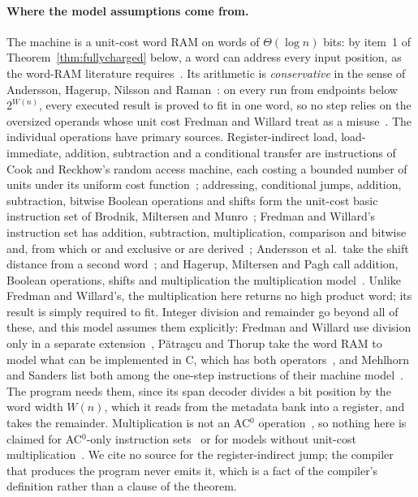\documentclass[11pt]{article}
\theoremstyle{definition}
\theoremstyle{remark}
\begin{document}
\paragraph{Where the model assumptions come from.}
The machine is a unit-cost word RAM on words of $\Theta(\log n)$ bits: by
item~1 of Theorem~\ref{thm:fullycharged} below, a word can address every
input position, as the word-RAM literature
requires~\cite{FredmanWillard93,AHNR98,PatrascuThorup14}. Its arithmetic is
\emph{conservative} in the sense of Andersson, Hagerup, Nilsson and
Raman~\cite{AHNR98}: on every run from endpoints below $2^{W(n)}$, every
executed result is proved to fit in one word, so no step relies on the
oversized operands whose unit cost Fredman and Willard treat as a
misuse~\cite{FredmanWillard93}. The individual operations have primary
sources. Register-indirect load, load-immediate, addition,
subtraction and a conditional transfer are instructions of Cook and
Reckhow's random access machine, each costing a bounded number of units under
its uniform cost function~\cite{CookReckhow73}; addressing, conditional
jumps, addition, subtraction, bitwise Boolean operations and shifts form the
unit-cost basic instruction set of Brodnik, Miltersen and
Munro~\cite{BMM97}; Fredman and Willard's instruction set has addition,
subtraction, multiplication, comparison and bitwise and, from which or and
exclusive or are derived~\cite{FredmanWillard93}; Andersson et al.\ take
the shift distance from a second word~\cite{AHNR98}; and Hagerup, Miltersen
and Pagh call addition, Boolean operations, shifts and multiplication the
multiplication model~\cite{HMP01}. Unlike Fredman and Willard's, the
multiplication here returns no high product word; its result is simply
required to fit. Integer division and remainder go beyond all of these, and
this model assumes them explicitly: Fredman and Willard use division only in
a separate extension~\cite{FredmanWillard93}, P\u{a}tra\c{s}cu and Thorup
take the word RAM to model what can be implemented in C, which has both
operators~\cite{PatrascuThorup14}, and Mehlhorn and Sanders list both among
the one-step instructions of their machine model~\cite{MehlhornSanders08}.
The program needs them, since its span decoder divides a bit position by
the word width $W(n)$, which it reads from the metadata bank into a
register, and takes the remainder. Multiplication is not an AC$^0$
operation~\cite{FredmanWillard93,AMT99}, so nothing here is claimed for
AC$^0$-only instruction sets~\cite{AMT99} or for models without unit-cost
multiplication~\cite{BMM97}. We cite no source for the register-indirect
jump; the compiler that produces the program never emits it, which is a
fact of the compiler's definition rather than a clause of the theorem.
\end{document}

